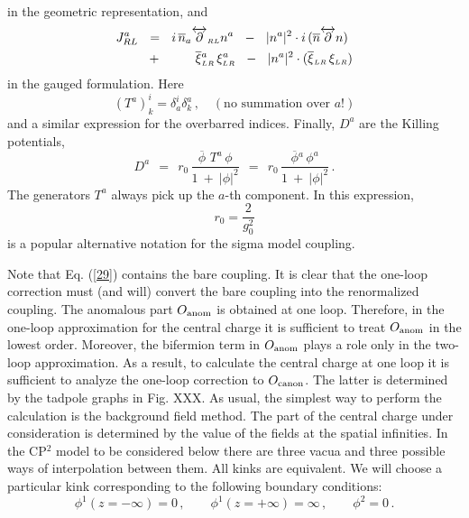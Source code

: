 \documentclass[epsfig,12pt]{article}
\def\beq{\begin{equation}}
\def\eeq{\end{equation}}
\def\beq{\begin{equation}}
\def\eeq{\end{equation}}
\newcommand{\p}{\partial}
\newcommand{\ov}{\overline}
\newcommand{\bphi}{\ov{\phi}{}}
\newcommand{\bxi}{\ov{\xi}{}}
\begin{document}
       in the geometric representation, and
\begin{align}
%
\notag
       J_{RL}^a  & ~~=~~ i\, \ov{n}{}_a \overleftrightarrow{\p}_{\scriptscriptstyle RL} n^a 
                   ~~-~~ |n^a|^2 \cdot i\, ( \ov{n} \overleftrightarrow{\p} n ) \\
%
                 & ~~+~~ \qquad 
                         \bxi{}_{\scriptscriptstyle LR}^a\, \xi_{\scriptscriptstyle LR}^a  ~~-~~
                         |n^a|^2 \cdot ( \bxi{}_{\scriptscriptstyle LR}\, \xi_{\scriptscriptstyle LR} )
\end{align}
       in the gauged formulation. Here
 \beq
 \left(T^a
 \right)^i_k = \delta_a^i\delta^a_k \,,\quad (\mbox{no summation over $a$!})
 \eeq
 and a similar expression for the overbarred indices.
Finally,
       $ D^a $ are the Killing potentials,
\beq
       D^a  ~~=~~ r_0\, \frac{ \bphi\,\, T^a\, \phi } 
                           {  1  ~+~  |\phi|^2  }
            ~~=~~ r_0\, \frac{ \bphi^a\, \phi^a   }
                           {  1  ~+~  |\phi|^2  }\,.
                           \label{29}
\eeq
       The generators $ T^a $ always pick up the $ a $-th component.
       In this expression, 
       \beq
       r _0=\frac{ 2 }{ g_0^2}
        \eeq 
        is a popular alternative notation for the sigma model coupling.
        
        Note that Eq. (\ref{29}) contains the bare coupling. It is clear that the one-loop correction must (and will) convert the bare coupling  into the renormalized coupling. The anomalous part $O_{\rm anom}$ is obtained at one loop.
        Therefore, in the one-loop approximation for the central charge 
        it is sufficient to treat $O_{\rm anom}$ in the lowest order. Moreover, the bifermion term 
        in $O_{\rm anom}$ plays a role only in the two-loop approximation. As a result, to calculate the central charge at one loop it is sufficient to analyze 
        the one-loop correction to $O_{\rm canon}$. The latter is determined by the tadpole graphs in Fig. XXX. As usual, the simplest way to perform the calculation is the background field method.
The part of the central charge under consideration is determined by the value of the fields at the spatial infinities. 
In the CP$^2$ model to be considered below there are three vacua and three possible ways
of interpolation between them. All kinks are equivalent. We will choose a  particular kink
corresponding to the following boundary conditions:
\beq
\phi^1 (z=-\infty ) = 0\,,\qquad \phi^1 (z=+\infty ) = \infty\,,\qquad  \phi^2 = 0\,.
\label{211}
\eeq
 
\end{document}

